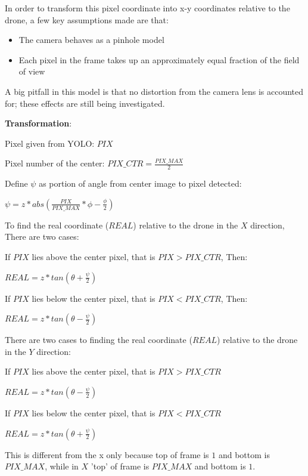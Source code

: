 \documentclass[12pt,letterpaper]{article}
\newcommand\tab[1][1cm]{\hspace*{#1}}
\begin{document}
			\begin{spacing}{.2}
			In order to transform this pixel coordinate into x-y coordinates relative to the drone, a few key assumptions made are that:

				\begin{itemize}
					\item The camera behaves as a pinhole model
					\item Each pixel in the frame takes up an approximately equal fraction of the field of view
				\end{itemize}

			A big pitfall in this model is that no distortion from the camera lens is accounted for; these effects are still being investigated.

				\textbf{Transformation}:

				Pixel given from YOLO: $PIX$

				Pixel number of the center: $PIX\_CTR = \frac{PIX\_MAX}{2}$

				Define $\psi$ as portion of angle from center image to pixel detected:

				\begin{center}
					$\psi = z * abs(\frac{PIX}{PIX\_MAX} * \phi - \frac{\phi}{2})$
				\end{center}

				To find the real coordinate ($REAL$) relative to the drone in the $X$ direction, There are two cases:

						\tab If $PIX$ lies above the center pixel, that is $PIX > PIX\_CTR$, Then:
						\begin{center}
							$REAL = z * tan(\theta + \frac{\psi}{2})$
						\end{center}
						\tab If $PIX$ lies below the center pixel, that is $PIX < PIX\_CTR$, Then:
						\begin{center}
							$REAL = z * tan(\theta - \frac{\psi}{2})$
						\end{center}
				There are two cases to finding the real coordinate ($REAL$) relative to the drone in the $Y$ direction:

						\tab If $PIX$ lies above the center pixel, that is $PIX > PIX\_CTR$
						\begin{center}
							$REAL = z * tan(\theta - \frac{\psi}{2})$
						\end{center}
						\tab If $PIX$ lies below the center pixel, that is $PIX < PIX\_CTR$
						\begin{center}
							$REAL = z * tan(\theta + \frac{\psi}{2})$
						\end{center}
				This is different from the x only because top of frame is $1$ and bottom is $PIX\_MAX$, while in $X$ 'top' of frame is $PIX\_MAX$ and bottom is $1$.
			\end{spacing}
\end{document}
